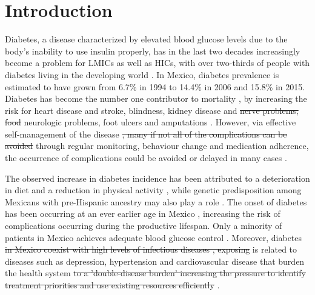 \documentclass[12pt,english]{article}
\providecommand{\DIFaddtex}[1]{{\protect\color{blue}#1}} %
\providecommand{\DIFdeltex}[1]{{\protect\color{red}\sout{#1}}}                      %
\providecommand{\DIFaddbegin}{} %
\providecommand{\DIFaddend}{} %
\providecommand{\DIFdelbegin}{} %
\providecommand{\DIFdelend}{} %
\providecommand{\DIFadd}[1]{\texorpdfstring{\DIFaddtex{#1}}{#1}} %
\providecommand{\DIFdel}[1]{\texorpdfstring{\DIFdeltex{#1}}{}} %
\begin{document}
\section{\label{sec:Introduction}Introduction }

Diabetes, a disease characterized by elevated blood glucose levels due to the body's inability to use insulin properly, has in the last two decades increasingly become a problem for \acp{LMIC} as well as \acp{HIC}, with over two-thirds of people with diabetes living in the developing world \parencite{InternationalDiabetesFederation2015}. In Mexico, diabetes prevalence is estimated to have grown from 6.7\% in 1994 to 14.4\% in 2006 \parencite{Barquera2013} and 15.8\% in 2015. Diabetes has become the number one contributor to mortality \parencite{InternationalDiabetesFederation2015}, by increasing the risk for heart disease and stroke, blindness, kidney disease and \DIFdelbegin \DIFdel{nerve problems, food }\DIFdelend \DIFaddbegin \DIFadd{neurologic problems, foot }\DIFaddend ulcers and amputations \parencite{Reynoso-Noveron2011}. However, via effective self-management of the disease \DIFdelbegin \DIFdel{, many if not all of the complications can be avoided }\DIFdelend \DIFaddbegin \DIFadd{through regular monitoring, behaviour change and medication adherence, the occurrence of complications could be avoided or delayed in many cases }\DIFaddend \parencite{Lim2011, Gregg2012}.

The observed increase in diabetes incidence has been attributed to a deterioration in diet and a reduction in physical activity \parencite{Barquera2008b,Basu2013}, while genetic predisposition among Mexicans with pre-Hispanic ancestry may also play a role \parencite{Williams2013}. The onset of diabetes has been occurring at an ever earlier age in Mexico \parencite{Bello-Chavolla2017a}, increasing the risk of complications occurring during the productive lifespan. Only a minority of patients in Mexico achieves adequate blood glucose control \parencite{Barquera2013}. Moreover, diabetes \DIFdelbegin \DIFdel{in Mexico coexist with high levels of infectious diseases , exposing }\DIFdelend \DIFaddbegin \DIFadd{is related to diseases such as depression, hypertension and cardiovascular disease that burden }\DIFaddend the health system \DIFdelbegin \DIFdel{to a 'double-disease burden' increasing the pressure to identify treatment priorities and use existing resources efficiently}%
\DIFdelend \DIFaddbegin \parencite{WorldHealthOrganization2016}\DIFaddend .
\end{document}
